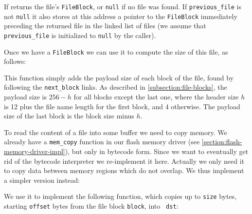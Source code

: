 If returns the file's {\tt FileBlock}, or {\tt null} if no file was found. If
{\tt previous\_file} is not {\tt null} it also stores at this address a
pointer to the {\tt FileBlock} immediately preceding the returned file in the
linked list of files (we assume that {\tt *previous\_file} is initialized to
{\tt null} by the caller).

Once we have a {\tt FileBlock} we can use it to compute the size of this file,
as follows:


This function simply adds the payload size of each block of the file, found by
following the {\tt next\_block} links. As described in
\cref{subsection:file-blocks}, the payload size is $256-h$ for all blocks
except the last one, where the header size $h$ is 12 plus the file name length
for the first block, and 4 otherwise. The payload size of the last block is the
block size minus $h$.

To read the content of a file into some buffer we need to copy memory. We
already have a {\tt mem\_copy} function in our flash memory driver (see
\cref{section:flash-memory-driver-impl}), but only in bytecode form. Since we
want to eventually get rid of the bytecode interpreter we re-implement it here.
Actually we only need it to copy data between memory regions which do not
overlap. We thus implement a simpler version instead:


We use it to implement the following function, which copies up to {\tt size}
bytes, starting {\tt *offset} bytes from the file block {\tt *block}, into {\tt
dst}:


